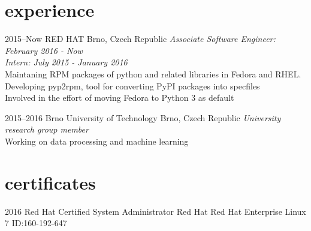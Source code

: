 \documentclass[]{friggeri-cv} %
\begin{document}

\section{experience}


\begin{entrylist}


\entry
{2015--Now}
{RED HAT}
{Brno, Czech Republic}
{\emph{Associate Software Engineer: February 2016 - Now} \\
\emph{Intern: July 2015 - January 2016} \\
Maintaning RPM packages of python and related libraries
in Fedora and RHEL.
\\Developing pyp2rpm, tool for converting PyPI packages into specfiles
\\Involved in the effort of moving Fedora to Python 3 as default}


\entry
{2015--2016}
{Brno University of Technology}
{Brno, Czech Republic}
{\emph{University research group member} \\ Working on data processing and machine learning}

\end{entrylist}



\section{certificates}

\begin{entrylist}


\entry
{2016}
{Red Hat Certified System Administrator}
{Red Hat}
{Red Hat Enterprise Linux 7 ID:160-192-647}


\end{entrylist}
\end{document}
